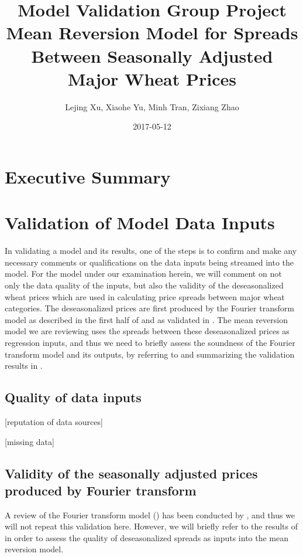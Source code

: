 \documentclass{article}
\title{Model Validation Group Project \\
Mean Reversion Model for Spreads Between Seasonally Adjusted Major Wheat Prices}
\date{2017-05-12}
\author{Lejing Xu, Xiaohe Yu, Minh Tran, Zixiang Zhao}
\begin{document}
\maketitle
\tableofcontents
\newpage

\section{Executive Summary}

\section{Validation of Model Data Inputs}

	In validating a model and its results, one of the steps is to confirm and make any necessary comments or qualifications on the data inputs being streamed into the model. For the model under our examination herein, we will comment on not only the data quality of the inputs, but also the validity of the deseasonalized wheat prices which are used in calculating price spreads between major wheat categories. The deseasonalized prices are first produced by the Fourier transform model as described in the first half of \cite{ken93} and as validated in \cite{wang12}. The mean reversion model we are reviewing uses the spreads between these deseasonalized prices as regression inputs, and thus we need to briefly assess the soundness of the Fourier transform model and its outputs, by referring to and summarizing the validation results in \cite{wang12}.

\subsection{Quality of data inputs}

	[reputation of data sources]

	[missing data]

\subsection{Validity of the seasonally adjusted prices produced by Fourier transform}

	A review of the Fourier transform model (\cite{ken93}) has been conducted by \cite{wang12}, and thus we will not repeat this validation here. However, we will briefly refer to the results of \cite{wang12} in order to assess the quality of deseasonalized spreads as inputs into the mean reversion model.
\end{document}
